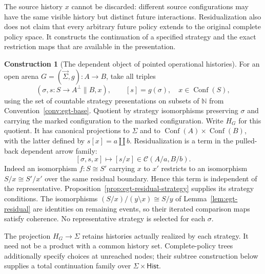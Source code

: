\documentclass[11pt,a4paper]{article}
\numberwithin{equation}{section}
\theoremstyle{definition}
\newtheorem{construction}[construction]{Construction}
\theoremstyle{remark}
\theoremstyle{plain}
\begin{document}
The source history $x$ cannot be discarded: different source
configurations may have the same visible history but distinct future
interactions. Residualization also does not claim that every arbitrary
future policy extends to the original complete policy space. It
constructs the continuation of a specified strategy and the exact
restriction maps that are available in the presentation.

\begin{construction}[The dependent object of pointed operational histories]
\label{con:egt-pointed-histories}
For an open arena $G=(\vec\Sigma,g):A\to B$, take all triples
\[
 (\sigma,s:S\to A^\perp\parallel B,x),
 \qquad [s]=g(\sigma),\quad x\in\operatorname{Conf}(S),
\]
using the set of countable strategy presentations on subsets of $\mathbb N$ from
Convention~\ref{conv:egt-base}. Quotient by strategy isomorphisms preserving
$\sigma$ and carrying the marked configuration to the marked configuration.
Write $H_G$ for this quotient. It has canonical projections to $\Sigma$ and
to $\operatorname{Conf}(A)\times\operatorname{Conf}(B)$, with the latter
defined by $s[x]=a\amalg b$. Residualization is a term in the pulled-back
dependent arrow family:
\[
 [\sigma,s,x]\longmapsto[s/x]\in\mathcal C(A/a,B/b).
\]
Indeed an isomorphism $f:S\cong S'$ carrying $x$ to $x'$ restricts to an
isomorphism $S/x\cong S'/x'$ over the same residual boundary. Hence this
term is independent of the representative. Proposition~\ref{prop:egt-residual-strategy}
supplies its strategy conditions. The isomorphisms
$(S/x)/(y\setminus x)\cong S/y$ of Lemma~\ref{lem:egt-residual} are
identities on remaining events, so their iterated comparison maps satisfy
coherence. No representative strategy is selected for each $\sigma$.

The projection $H_G\to\Sigma$ retains histories actually realized by each
strategy. It need not be a product with a common history set. Complete-policy
trees additionally specify choices at unreached nodes; their subtree
construction below supplies a total continuation family over
$\Sigma\times\mathsf{Hist}$.
\end{construction}
\end{document}
